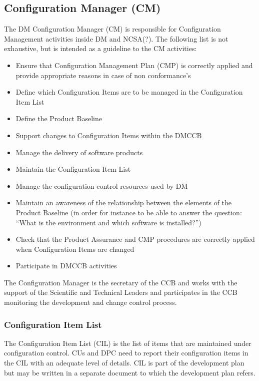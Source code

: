 \subsection{Configuration Manager (CM)}\label{role:cm}

The DM Configuration Manager (CM) is responsible for Configuration Management activities inside DM and NCSA(?).
The following list is not exhaustive, but is intended as a guideline to the CM activities:

\begin{itemize}
\item Ensure that Configuration Management Plan (CMP) is correctly applied and provide appropriate reasons in case of non conformance's
\item Define  which Configuration Items are to be managed in the Configuration Item List
\item Define the Product Baseline
\item Support changes to Configuration Items within the DMCCB
\item Manage the delivery of software products
\item Maintain the Configuration Item List
\item Manage the configuration control resources used by DM
\item Maintain an awareness of the relationship between  the elements of the Product Baseline (in order for instance to be able to answer the question: ``What is the environment and which software is installed?'')
 \item Check that the Product Assurance and CMP procedures are correctly applied when Configuration Items are changed
 \item Participate in DMCCB activities
\end{itemize}

The Configuration Manager is the secretary of the CCB and works with the support of the Scientific and Technical Leaders and participates in the CCB monitoring the development and change control process.

\subsubsection{Configuration Item List}

The Configuration Item List (CIL) is the list of items that are maintained under configuration control.
CUs and DPC need to report their configuration items in the CIL with an adequate level of details.
CIL is part of the development plan but may be written in a separate document to which the development plan refers.

